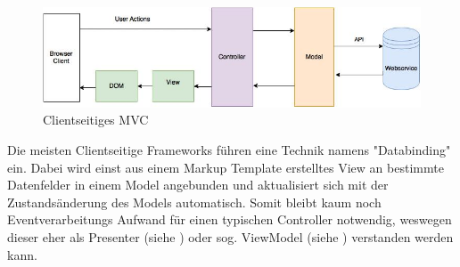 \begin{figure}[htp]     %
\centering
\includegraphics[width=1.0\textwidth]{images/client_side_mvc} 
\caption{Clientseitiges MVC}\label{fig:client_side_mvc}
\end{figure}

Die meisten Clientseitige Frameworks führen eine Technik namens "Databinding" ein. Dabei wird einst aus einem Markup Template erstelltes View an bestimmte Datenfelder in einem Model angebunden und aktualisiert sich mit der Zustandsänderung des Models automatisch. Somit bleibt kaum noch Eventverarbeitungs Aufwand für einen typischen Controller notwendig, weswegen dieser eher als Presenter (siehe \cite{MSDN:2016:MVP}) oder sog. ViewModel (siehe \cite{MSDN:2016:MVVM}) verstanden werden kann.


    



